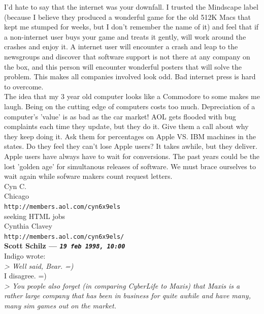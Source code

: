 \documentclass[11pt,twoside,a4paper]{article}
\begin{document}
\begin{multicols*}{2}
I'd hate to say that the internet was your downfall.  I trusted the Mindscape label (because I believe they produced a wonderful game for the old 512K Macs that kept me stumped for weeks, but I don't remember the name of it) and feel that if a non-internet user buys your game and treats it gently, will work around the crashes and enjoy it.  A internet user will encounter a crash and leap to the newsgroups and discover that software support is not there at any company on the box, and this person will encounter wonderful posters that will solve the problem.  This makes all companies involved look odd.  Bad internet press is hard to overcome.~\\

The idea that my 3 year old computer looks like a Commodore to some makes me laugh.  Being on the cutting edge of computers costs too much.  Depreciation of a computer's 'value' is as bad as the car market!  AOL gets flooded with bug complaints each time they update, but they do it.  Give them a call about why they keep doing it.  Ask them for percentages on Apple VS. IBM machines in the states.  Do they feel they can't lose Apple users?  It takes awhile, but they deliver.  Apple users have always have to wait for conversions.  The past years could be the lost 'golden age' for simultanous releases of software.  We must brace ourselves to wait again while sofware makers count request letters.~\\
Cyn C.~\\
Chicago~\\
\texttt{http://members.aol.com/cyn6x9els}~\\
seeking HTML jobs~\\
Cynthia Clavey~\\
\texttt{http://members.aol.com/cyn6x9els/}~\\

 
		
	
		
\textbf{Scott Schilz --- \emph{\texttt{19 feb 1998, 10:00}}}~\\

Indigo wrote:~\\
\emph{> Well said, Bear. =)}~\\

I disagree. =)~\\

\emph{> You people also forget (in comparing CyberLife to Maxis) that Maxis is a rather large company that has been in business for quite awhile and have many, many sim games out on the market.}~\\


\end{multicols*}
\end{document}
